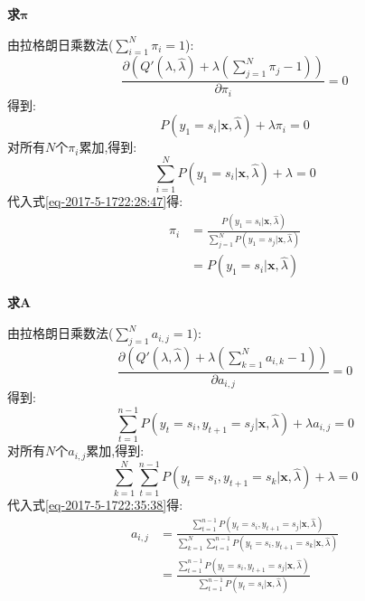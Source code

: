 \documentclass[UTF8,a4paper]{ctexart}%
\begin{document}
            \textbf{求$\bm{\pi}$}

            由拉格朗日乘数法($\sum_{i= 1}^N \pi_i = 1$):
            \begin{equation}
              \frac{\partial\left( Q'(\lambda,\hat{\lambda}) + \lambda\left( \sum_{j = 1}^N \pi_j - 1\right) \right)}{\partial \pi_i} = 0
            \end{equation}
            得到:
            \begin{equation}
              P(y_1 = s_i|\bm{x},\hat{\lambda}) + \lambda \pi_i = 0
              \label{eq-2017-5-1722:28:47}
            \end{equation}
            对所有$N$个$\pi_i$累加,得到:
            \begin{equation}
              \sum_{i = 1}^N P(y_1 = s_i|\bm{x},\hat{\lambda}) + \lambda = 0
            \end{equation}
            代入式\eqref{eq-2017-5-1722:28:47}得:
            \begin{equation}
              \begin{split}
              \pi_i &= \frac{P(y_1 = s_i|\bm{x},\hat{\lambda}) }{\sum_{j = 1}^N P(y_1 = s_j|\bm{x},\hat{\lambda})}\\
              &= P(y_1 = s_i|\bm{x},\hat{\lambda})
              \end{split}
            \end{equation}

            \textbf{求$\bm{A}$}

            由拉格朗日乘数法($\sum_{j = 1}^N a_{i,j} = 1$):
            \begin{equation}
              \frac{\partial\left( Q'(\lambda,\hat{\lambda}) + \lambda\left( \sum_{k = 1}^N a_{i,k} - 1 \right) \right)}{\partial a_{i,j}} = 0
            \end{equation}
            得到:
            \begin{equation}
              \sum_{t = 1}^{n-1}
                  P(y_t = s_i , y_{t+1} = s_j|\bm{x},\hat{\lambda})  + \lambda a_{i,j} = 0
              \label{eq-2017-5-1722:35:38}
            \end{equation}
            对所有$N$个$a_{i,j}$累加,得到:
            \begin{equation}
              \sum_{k = 1}^N \sum_{t = 1}^{n-1}
                  P(y_t = s_i , y_{t+1} = s_k|\bm{x},\hat{\lambda})  + \lambda = 0
            \end{equation}
            代入式\eqref{eq-2017-5-1722:35:38}得:
            \begin{equation}
              \begin{split}
              a_{i,j} &= \frac{ \sum_{t = 1}^{n-1}
                  P(y_t = s_i , y_{t+1} = s_j|\bm{x},\hat{\lambda}) }{\sum_{k = 1}^N \sum_{t = 1}^{n-1}
                  P(y_t = s_i , y_{t+1} = s_k|\bm{x},\hat{\lambda})}\\
                  &= \frac{ \sum_{t = 1}^{n-1}
                      P(y_t = s_i , y_{t+1} = s_j|\bm{x},\hat{\lambda}) }{ \sum_{t = 1}^{n-1}
                      P(y_t = s_i|\bm{x},\hat{\lambda})}
                \end{split}
            \end{equation}
\end{document}
